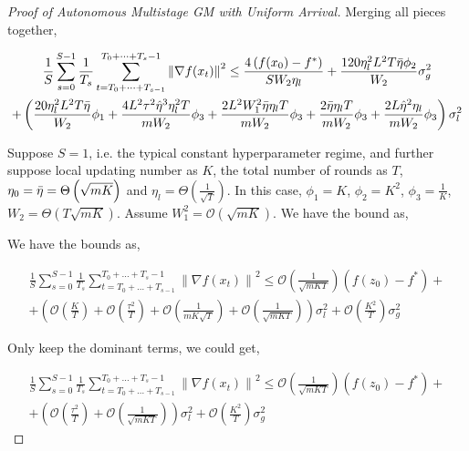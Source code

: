 \begin{proof}[Proof of Autonomous Multistage GM with Uniform Arrival]
Merging all pieces together,

\begin{equation}
\begin{gathered}
 \frac{1}{S}\sum_{s=0}^{S-1} \frac{1}{T_s}\sum_{t=T_0+\dots+T_{s-1} }^{T_0+\dots+T_s-1} \left\|\nabla f(x_t)\right\|^2
\leq \frac{4 \left(f(x_0) - f^\ast  \right)}{S W_2 \eta_l} 
+ \frac{120 \eta^2_l L^2 T \Bar{\eta} \phi_2}{W_2} \sigma_g^2 \\
+ \left( \frac{20  \eta^2_l L^2 T \Bar{\eta}}{W_2} \phi_1 + \frac{4 L^2\tau^2\hat{\eta}^3\eta_l^2T}{mW_2}\phi_3 + \frac{2 L^2W_1^2 \Bar{\eta} \eta_l T}{m W_2}\phi_3 + \frac{2 \Bar{\eta} \eta_l T}{m W_2}\phi_3 + \frac{2 L\hat{\eta}^2\eta_l}{m W_2}\phi_3 \right)  \sigma_l^2
\end{gathered}\nonumber
\end{equation}


Suppose $S=1$, i.e. the typical constant hyperparameter regime, and further suppose local updating number as $K$, the total number of rounds as $T$, $\eta_0=\Bar{\eta}=\Theta\left(\sqrt{mK}\right)$ and $\eta_l=\Theta\left(\frac{1}{\sqrt{T}}\right)$. In this case, $\phi_1=K$, $\phi_2=K^2$, $\phi_3=\frac{1}{K}$, $W_2=\Theta\left(T\sqrt{mK}\right)$. Assume $W_1^2=\mathcal{O}\left(\sqrt{mK}\right)$. We have the bound as,

We have the bounds as,

\begin{equation}
\begin{gathered}
 \frac{1}{S}\sum_{s=0}^{S-1} \frac{1}{T_s}\sum_{t=T_0+\dots+T_{s-1} }^{T_0+\dots+T_s-1} \left\|\nabla f(x_t)\right\|^2
\leq \mathcal{O}\left(\frac{1}{\sqrt{mKT}}\right) \left(f(z_0) - f^\ast  \right) + \\
+\left( \mathcal{O}\left(\frac{K}{T}\right) + \mathcal{O}\left(\frac{\tau^2}{T}\right) + \mathcal{O}\left(\frac{1}{mK\sqrt{T}}\right) + \mathcal{O}\left(\frac{1}{\sqrt{mKT}}\right) \right)\sigma_l^2 +  \mathcal{O}\left( \frac{K^2}{T} \right) \sigma_g^2
\end{gathered}\nonumber
\end{equation}

Only keep the dominant terms, we could get,


\begin{equation}
\begin{gathered}
 \frac{1}{S}\sum_{s=0}^{S-1} \frac{1}{T_s}\sum_{t=T_0+\dots+T_{s-1} }^{T_0+\dots+T_s-1} \left\|\nabla f(x_t)\right\|^2
\leq \mathcal{O}\left(\frac{1}{\sqrt{mKT}}\right) \left(f(z_0) - f^\ast  \right) + \\
+\left( \mathcal{O}\left(\frac{\tau^2}{T}\right) + \mathcal{O}\left(\frac{1}{\sqrt{mKT}} \right) \right)\sigma_l^2 +  \mathcal{O}\left( \frac{K^2}{T} \right) \sigma_g^2
\end{gathered}\nonumber
\end{equation}




\end{proof}

